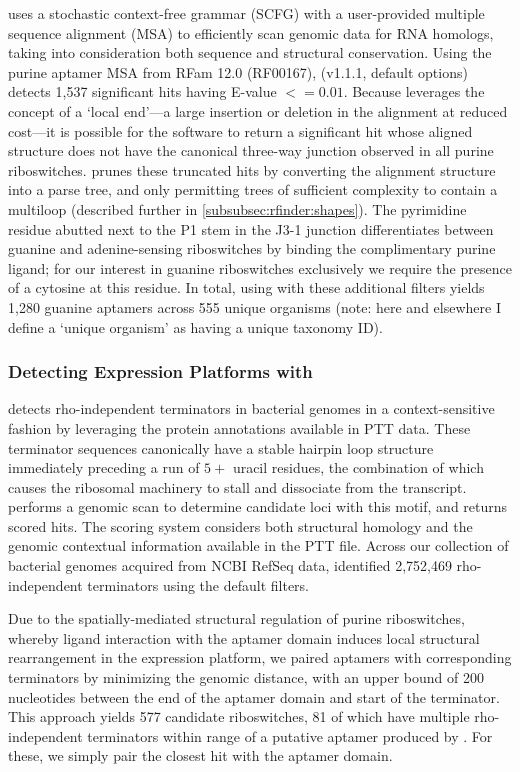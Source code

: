 \infernal uses a stochastic context-free grammar (SCFG) with a user-provided multiple sequence alignment (MSA) to efficiently scan genomic data for RNA homologs, taking into consideration both sequence and structural conservation. Using the purine aptamer MSA from RFam 12.0 (RF00167), \infernal (v1.1.1, default options) detects 1,537 significant hits having E-value $<= 0.01$. Because \infernal leverages the concept of a `local end'---a large insertion or deletion in the alignment at reduced cost---it is possible for the software to return a significant hit whose aligned structure does not have the canonical three-way junction observed in all purine riboswitches. \rfinder prunes these truncated \infernal hits by converting the alignment structure into a parse tree, and only permitting trees of sufficient complexity to contain a multiloop (described further in \ref{subsubsec:rfinder:shapes}). The pyrimidine residue abutted next to the P1 stem in the J3-1 junction differentiates between guanine and adenine-sensing riboswitches by binding the complimentary purine ligand; for our interest in guanine riboswitches exclusively we require the presence of a cytosine at this residue. In total, using \infernal with these additional filters yields 1,280 guanine aptamers across 555 unique organisms (note: here and elsewhere I define a `unique organism' as having a unique taxonomy ID).

\subsubsection{Detecting Expression Platforms with \tthp}
\label{subsubsec:rfinder:tthp}

\tthp detects rho-independent terminators in bacterial genomes in a context-sensitive fashion by leveraging the protein annotations available in PTT data. These terminator sequences canonically have a stable hairpin loop structure immediately preceding a run of $5+$ uracil residues, the combination of which causes the ribosomal machinery to stall and dissociate from the transcript. \tthp performs a genomic scan to determine candidate loci with this motif, and returns scored hits. The scoring system considers both structural homology and the genomic contextual information available in the PTT file. Across our collection of bacterial genomes acquired from NCBI RefSeq data, \tthp identified 2,752,469 rho-independent terminators using the default filters.

Due to the spatially-mediated structural regulation of purine riboswitches, whereby ligand interaction with the aptamer domain induces local structural rearrangement in the expression platform, we paired aptamers with corresponding terminators by minimizing the genomic distance, with an upper bound of 200 nucleotides between the end of the aptamer domain and start of the terminator. This approach yields 577 candidate riboswitches, 81 of which have multiple rho-independent terminators within range of a putative aptamer produced by \infernal. For these, we simply pair the closest \tthp hit with the aptamer domain.

